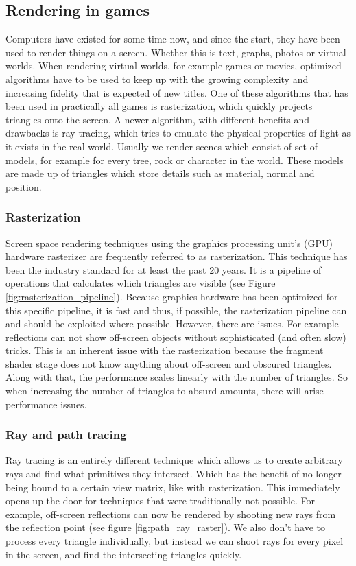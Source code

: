 \subsection{Rendering in games} \label{related_work:rendering}
Computers have existed for some time now, and since the start, they have been used to render things on a screen. Whether this is text, graphs, photos or virtual worlds. When rendering virtual worlds, for example games or movies, optimized algorithms have to be used to keep up with the growing complexity and increasing fidelity that is expected of new titles. One of these algorithms that has been used in practically all games is rasterization, which quickly projects triangles onto the screen. A newer algorithm, with different benefits and drawbacks is ray tracing, which tries to emulate the physical properties of light as it exists in the real world. Usually we render scenes which consist of set of models, for example for every tree, rock or character in the world. These models are made up of triangles which store details such as material, normal and position.


\subsubsection{Rasterization} \label{related_work:rendering:rasterization}
Screen space rendering techniques using the graphics processing unit's (GPU) hardware rasterizer are frequently referred to as rasterization. This technique has been the industry standard for at least the past 20 years. It is a pipeline of operations that calculates which triangles are visible (see Figure \ref{fig:rasterization_pipeline}). Because graphics hardware has been optimized for this specific pipeline, it is fast and thus, if possible, the rasterization pipeline can and should be exploited where possible. However, there are issues. For example reflections can not show off-screen objects without sophisticated (and often slow) tricks. This is an inherent issue with the rasterization because the fragment shader stage does not know anything about off-screen and obscured triangles. Along with that, the performance scales linearly with the number of triangles. So when increasing the number of triangles to absurd amounts, there will arise performance issues.

\subsubsection{Ray and path tracing} \label{related_work:rendering:ray_tracing}
Ray tracing is an entirely different technique which allows us to create arbitrary rays and find what primitives they intersect. Which has the benefit of no longer being bound to a certain view matrix, like with rasterization. This immediately opens up the door for techniques that were traditionally not possible. For example, off-screen reflections can now be rendered by shooting new rays from the reflection point (see figure \ref{fig:path_ray_raster}). We also don't have to process every triangle individually, but instead we can shoot rays for every pixel in the screen, and find the intersecting triangles quickly.

